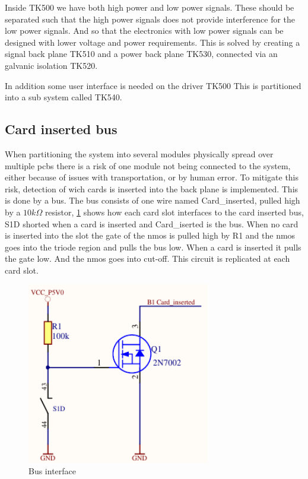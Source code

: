 Inside TK500 we have both high power and low power signals. These should be separated such that the high power signals does not provide interference for the low power signals. And so that the electronics with low power signals can be designed with lower voltage and power requirements. This is solved by creating a signal back plane TK510 and a power back plane TK530, connected via an galvanic isolation TK520.

In addition some user interface is needed on the driver TK500 This is partitioned into a sub system called TK540.


 
\subsection{Card inserted bus}
\label{section:ci}
When partitioning the system into several modules physically spread over multiple pcbs there is a risk of one module not being connected to the system, either because of issues with transportation, or by human error. To mitigate this risk, detection of wich cards is inserted into the back plane is implemented. This is done by a bus.
The bus consists of one wire named Card\_inserted, pulled high by a $10k\Omega$ resistor, \cref{fig:ki_bi} shows how each card slot interfaces to the card inserted bus, S1D shorted when a card is inserted and Card\_iserted is the bus. When no card is inserted into the slot the gate of the nmos is pulled high by R1 and the nmos goes into the triode region and pulls the bus low. When a card is inserted it pulls the gate low. And the nmos goes into cut-off. This circuit is replicated at each card slot.

\begin{figure}[h]
    \centering
    \includegraphics[width=8cm]{img/KI_BUS.pdf}
    \caption{Bus interface}
    \label{fig:ki_bi}
\end{figure}

